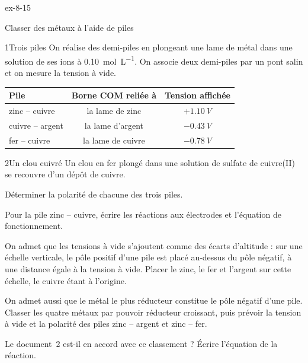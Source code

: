 \begin{blocLivre}{ex-8-15}
\begin{exercice}[3]{Classer des métaux à l'aide de piles}
\begin{docu}{1}{Trois piles}
On réalise des demi-piles en plongeant une lame de métal dans une solution de ses ions à \qty{0,10}{mol.L^{-1}}. On
associe deux demi-piles par un pont salin et on mesure la tension à vide.
\par\smallskip
{\small\renewcommand{\arraystretch}{1.2}
\begin{tabular}{@{}lcc@{}}\toprule
Pile & Borne COM reliée à & Tension affichée\\\midrule
zinc -- cuivre & la lame de zinc & $+\qty{1,10}{V}$\\
cuivre -- argent & la lame d'argent & $-\qty{0,43}{V}$\\
fer -- cuivre & la lame de cuivre & $-\qty{0,78}{V}$\\\bottomrule
\end{tabular}}
\end{docu}
\begin{docu}{2}{Un clou cuivré}
Un clou en fer plongé dans une solution de sulfate de cuivre(II) se recouvre d'un dépôt de cuivre.
\end{docu}
\begin{questions}
\item Déterminer la polarité de chacune des trois piles.
\item Pour la pile zinc -- cuivre, écrire les réactions aux électrodes et l'équation de fonctionnement.
\item On admet que les tensions à vide s'ajoutent comme des écarts d'altitude : sur une échelle verticale, le pôle
positif d'une pile est placé au-dessus du pôle négatif, à une distance égale à la tension à vide. Placer le zinc, le fer
et l'argent sur cette échelle, le cuivre étant à l'origine.
\item \initiative On admet aussi que le métal le plus réducteur constitue le pôle négatif d'une pile. Classer les quatre
métaux par pouvoir réducteur croissant, puis prévoir la tension à vide et la polarité des piles zinc -- argent et
zinc -- fer.
\item Le document~2 est-il en accord avec ce classement ? Écrire l'équation de la réaction.
\end{questions}
\end{exercice}
\end{blocLivre}
